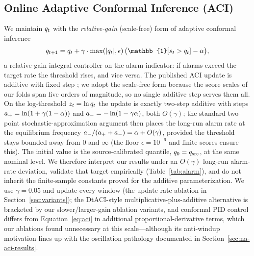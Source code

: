 \subsection{Online Adaptive Conformal Inference (ACI)}
We maintain $q_t$ with the \emph{relative-gain} (scale-free) form of adaptive conformal inference \cite{aci2021}
\begin{equation}
q_{t+1} = q_t + \gamma \cdot \max(|q_t|,\epsilon)\, \bigl(\mathbb{1}[\st > q_t] - \alphaNom\bigr),
\label{eq:aci}
\end{equation}
a relative-gain integral controller on the alarm indicator: if alarms exceed the target rate the threshold rises, and vice versa. The published ACI update is additive with fixed step \cite{aci2021}; we adopt the scale-free form because the score scales of our folds span five orders of magnitude, so no single additive step serves them all. On the log-threshold $z_t=\ln q_t$ the update is exactly two-step additive with steps $a_+=\ln(1+\gamma(1-\alpha))$ and $a_-=-\ln(1-\gamma\alpha)$, both $O(\gamma)$; the standard two-point stochastic-approximation argument then places the long-run alarm rate at the equilibrium frequency $a_-/(a_++a_-)=\alpha+O(\gamma)$, provided the threshold stays bounded away from $0$ and $\infty$ (the floor $\epsilon=10^{-6}$ and finite scores ensure this). The initial value is the source-calibrated quantile, $q_0=q_{\mathrm{src}}$, at the same nominal level. We therefore interpret our results under an $O(\gamma)$ long-run alarm-rate deviation, validate that target empirically (Table~\ref{tab:alarm}), and do not inherit the finite-sample constants proved for the additive parameterization. We use $\gamma=0.05$ and update every window (the update-rate ablation in Section~\ref{sec:variants}); the DtACI-style multiplicative-plus-additive alternative \cite{dtaci2022} is bracketed by our slower/larger-gain ablation variants, and conformal PID control \cite{conformalpid2023} differs from Equation~\ref{eq:aci} in additional proportional-derivative terms, which our ablations found unnecessary at this scale---although its anti-windup motivation lines up with the oscillation pathology documented in Section~\ref{sec:na-aci-results}.

